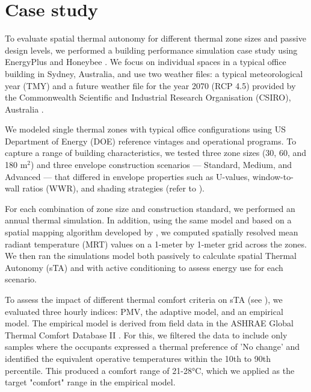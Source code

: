 
\section{Case study}
\label{sec:case-study}

To evaluate spatial thermal autonomy for different thermal zone sizes and passive design levels, we performed a building performance simulation case study using EnergyPlus \citep{crawley_energy_plus_2001} and Honeybee \citep{sadeghipour_roudsari_ladybug_2013}. We focus on individual spaces in a typical office building in Sydney, Australia, and use two weather files: a typical meteorological year (TMY) and a future weather file for the year 2070 (RCP 4.5) provided by the Commonwealth Scientific and Industrial Research Organisation (CSIRO), Australia \citep{ren_projected_2021}.

We modeled single thermal zones with typical office configurations using US Department of Energy (DOE) reference vintages and operational programs. To capture a range of building characteristics, we tested three zone sizes (30, 60, and 180 m$^2$) and three envelope construction scenarios — Standard, Medium, and Advanced — that differed in envelope properties such as U-values, window-to-wall ratios (WWR), and shading strategies (refer to ).



For each combination of zone size and construction standard, we performed an annual thermal simulation. In addition, using the same model and based on a spatial mapping algorithm developed by \citet{mackey_2015}, we computed spatially resolved mean radiant temperature (MRT) values on a 1-meter by 1-meter grid across the zones. We then ran the simulations model both passively to calculate spatial Thermal Autonomy (sTA) and with active conditioning to assess energy use for each scenario.

To assess the impact of different thermal comfort criteria on sTA (see ), we evaluated three hourly indices: PMV, the adaptive model, and an empirical model. The empirical model is derived from field data in the ASHRAE Global Thermal Comfort Database II \citep{foldvary_licina_development_2018,parkinson_ashrae_2022}. For this, we filtered the data to include only samples where the occupants expressed a thermal preference of 'No change' and identified the equivalent operative temperatures within the 10th to 90th percentile. This produced a comfort range of 21-28°C, which we applied as the target "comfort" range in the empirical model.

